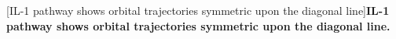 \begin{centering}
\captionsetup{parbox=none}
[IL-1 pathway shows orbital trajectories symmetric upon the diagonal line]{\textbf{IL-1 pathway shows orbital trajectories symmetric upon the diagonal line.}
}
\end{centering}
